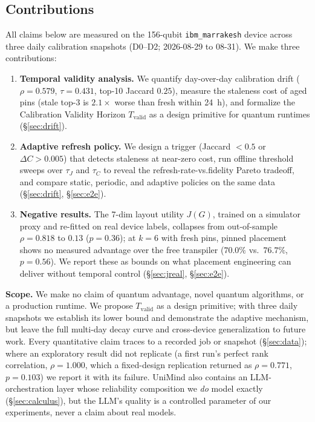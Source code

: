 \documentclass[journal,10pt,twocolumn]{IEEEtran}
\begin{document}
\subsection{Contributions}
All claims below are measured on the 156-qubit \texttt{ibm\_marrakesh} device across three daily calibration
snapshots (D0--D2; 2026-08-29 to 08-31). We make three contributions:
\begin{enumerate}[leftmargin=1.8em,itemsep=1pt,topsep=2pt]
\item \textbf{Temporal validity analysis.} We quantify day-over-day calibration drift
($\rho{=}0.579$, $\tau{=}0.431$, top-10 Jaccard $0.25$), measure the staleness cost of aged pins
(stale top-3 is $2.1\times$ worse than fresh within 24~h), and formalize the Calibration Validity
Horizon $T_{\mathrm{valid}}$ as a design primitive for quantum runtimes (\S\ref{sec:drift}).
\item \textbf{Adaptive refresh policy.} We design a trigger (Jaccard $<0.5$ or $\Delta C{>}0.005$)
that detects staleness at near-zero cost, run offline threshold sweeps over $\tau_J$ and $\tau_C$ to
reveal the refresh-rate-vs.\-fidelity Pareto tradeoff, and compare static, periodic, and adaptive
policies on the same data (\S\ref{sec:drift}, \S\ref{sec:e2e}).
\item \textbf{Negative results.} The 7-dim layout utility $J(G)$, trained on a simulator proxy and
re-fitted on real device labels, collapses from out-of-sample $\rho{=}0.818$ to $0.13$
($p{=}0.36$); at $k{=}6$ with fresh pins, pinned placement shows no measured advantage over the
free transpiler ($70.0\%$ vs.\ $76.7\%$, $p{=}0.56$). We report these as bounds on what placement
engineering can deliver without temporal control (\S\ref{sec:jreal}, \S\ref{sec:e2e}).
\end{enumerate}

\noindent\textbf{Scope.} We make no claim of quantum advantage, novel quantum algorithms, or a production runtime.
We propose $T_{\mathrm{valid}}$ as a design primitive; with three daily snapshots we establish its lower bound and
demonstrate the adaptive mechanism, but leave the full multi-day decay curve and cross-device generalization to
future work. Every quantitative claim traces to a recorded job or snapshot (\S\ref{sec:data}); where an
exploratory result did not replicate (a first run's perfect rank correlation, $\rho{=}1.000$, which a fixed-design
replication returned as $\rho{=}0.771$, $p{=}0.103$) we report it with its failure. UniMind also contains an
LLM-orchestration layer whose reliability composition we \emph{do} model exactly (\S\ref{sec:calculus}), but the
LLM's quality is a controlled parameter of our experiments, never a claim about real models.
\end{document}
